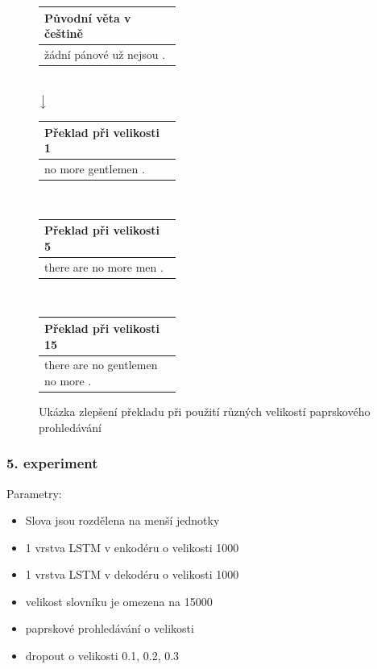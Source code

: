 \begin{figure}[H]
    \begin{center}
        \begin{tabular}{| >{\centering\arraybackslash}p{0.4\linewidth} |}
          \hline
          Původní věta v češtině\\
          \hline
          žádní pánové už nejsou .\\
          \hline
        \end{tabular}
        \\ \vspace{2.5mm}
        $\big\downarrow$
        \\ \vspace{2.5mm}
        \begin{tabular}{| >{\centering\arraybackslash}p{0.4\linewidth} |}
          \hline
          Překlad při velikosti 1\\
          \hline
          no more gentlemen .\\
          \hline
        \end{tabular}
        \\ \vspace{5mm}
        \begin{tabular}{| >{\centering\arraybackslash}p{0.4\linewidth} |}
          \hline
          Překlad při velikosti 5\\
          \hline
          there are no more men .\\
          \hline
        \end{tabular}
        \\ \vspace{5mm}
        \begin{tabular}{| >{\centering\arraybackslash}p{0.4\linewidth} |}
          \hline
          Překlad při velikosti 15\\
          \hline
          there are no gentlemen no more .\\
          \hline
        \end{tabular}
    \end{center}
	\caption{Ukázka zlepšení překladu při použití různých velikostí paprskového prohledávání}
	\label{img:beamTranslation}
\end{figure}

\subsubsection{5. experiment}\label{experiment5}
Parametry:
\begin{itemize}
  \item Slova jsou rozdělena na menší jednotky
  \item 1 vrstva LSTM v enkodéru o velikosti 1000
  \item 1 vrstva LSTM v dekodéru o velikosti 1000
  \item velikost slovníku je omezena na 15000
  \item paprskové prohledávání o velikosti
  \item dropout o velikosti 0.1, 0.2, 0.3
\end{itemize}

